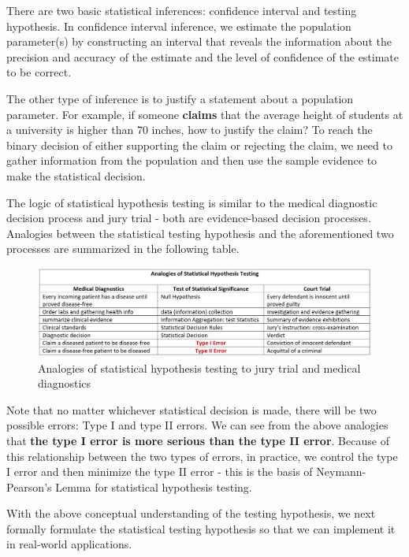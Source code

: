 \documentclass[
]{book}
\begin{document}
There are two basic statistical inferences: confidence interval and testing hypothesis. In confidence interval inference, we estimate the population parameter(s) by constructing an interval that reveals the information about the precision and accuracy of the estimate and the level of confidence of the estimate to be correct.

The other type of inference is to justify a statement about a population parameter. For example, if someone \textbf{claims} that the average height of students at a university is higher than 70 inches, how to justify the claim? To reach the binary decision of either supporting the claim or rejecting the claim, we need to gather information from the population and then use the sample evidence to make the statistical decision.

The logic of statistical hypothesis testing is similar to the medical diagnostic decision process and jury trial - both are evidence-based decision processes. Analogies between the statistical testing hypothesis and the aforementioned two processes are summarized in the following table.

\begin{figure}

{\centering \includegraphics[width=0.8\linewidth]{img07/w07-HypothesisTest-logic} 

}

\caption{Analogies of statistical hypothesis testing to jury trial and medical diagnostics}\label{fig:unnamed-chunk-107}
\end{figure}

Note that no matter whichever statistical decision is made, there will be two possible errors: Type I and type II errors. We can see from the above analogies that \textbf{the type I error is {more serious than} the type II error}. Because of this relationship between the two types of errors, in practice, we control the type I error and then minimize the type II error - this is the basis of Neymann-Pearson's Lemma for statistical hypothesis testing.

With the above conceptual understanding of the testing hypothesis, we next formally formulate the statistical testing hypothesis so that we can implement it in real-world applications.
\end{document}
